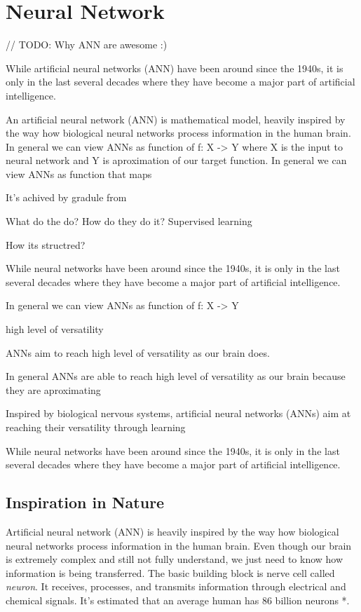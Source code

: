 \chapter{Neural Network}




// TODO: Why ANN are awesome :)

While artificial neural networks (ANN) have been around since the 1940s, it is only in the last several decades where they have become a major part of artificial intelligence.


An artificial neural network (ANN) is mathematical model, heavily inspired by the way how biological neural networks process information in the human brain.
In general we can view ANNs as function of f: X -> Y where X is the input to neural network and Y is aproximation of our target function.
In general we can view ANNs as function that maps

It's achived by gradule from

What do the do?
How do they do it?
Supervised learning

How its structred?

While neural networks have been around since the 1940s, it is only in the last several decades where they have become a major part of artificial intelligence.


In general we can view ANNs as function of f: X -> Y

high level of versatility

ANNs aim to reach high level of versatility as our brain does.

In general ANNs are able to reach high level of versatility as our brain because they are aproximating

Inspired by biological nervous systems, artificial neural networks (ANNs) aim at reaching their versatility through learning

While neural networks have been around since the 1940s, it is only in the last several decades where they have become a major part of artificial intelligence.


\section{Inspiration in Nature}

Artificial neural network (ANN) is heavily inspired by the way how biological neural networks process information in the human brain.
Even though our brain is extremely complex and still not fully understand, we just need to know how information is being transferred.
The basic building block is nerve cell called \textit{neuron}. It receives, processes, and transmits information through electrical and chemical signals.
It's estimated that an average human has 86 billion neurons *.

